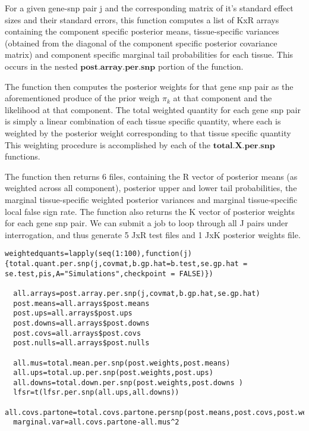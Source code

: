 \documentclass[10pt]{article}
\begin{document}
For a given gene-snp pair j and the corresponding matrix of it's standard effect sizes and their standard errors, this function computes a list of KxR arrays  containing the component specific posterior means, tissue-specific variances (obtained from the diagonal of the component specific posterior covariance matrix) and component specific marginal tail probabilities for each tissue. This occurs in the nested $\textbf{post.array.per.snp}$ portion of the function.

The function then computes the posterior weights for that gene snp pair as the aforementioned produce of the prior weigh $\pi_{k}$ at that component and the likelihood at that component. The total weighted quantity for each gene snp pair is simply a linear combination of each tissue specific quantity, where each is weighted by the posterior weight corresponding to that tissue specific quantity This weighting procedure is accomplished by each of the $\textbf{total.X.per.snp}$ functions.

The function then returns  6 files, containing the R vector of posterior means (as weighted across all component), posterior upper and lower tail probabilities, the marginal tissue-specific weighted posterior variances and marginal tissue-specific local false sign rate. The function also returns the K vector of posterior weights for each gene snp pair. We can submit a job to loop through all J pairs under interrogation, and thus generate 5 JxR test files and 1 JxK posterior weights file.

\begin{verbatim}
weightedquants=lapply(seq(1:100),function(j){total.quant.per.snp(j,covmat,b.gp.hat=b.test,se.gp.hat = se.test,pis,A="Simulations",checkpoint = FALSE)})
                          
  all.arrays=post.array.per.snp(j,covmat,b.gp.hat,se.gp.hat)
  post.means=all.arrays$post.means
  post.ups=all.arrays$post.ups
  post.downs=all.arrays$post.downs
  post.covs=all.arrays$post.covs
  post.nulls=all.arrays$post.nulls
  
  all.mus=total.mean.per.snp(post.weights,post.means)
  all.ups=total.up.per.snp(post.weights,post.ups)
  all.downs=total.down.per.snp(post.weights,post.downs )
  lfsr=t(lfsr.per.snp(all.ups,all.downs))
  all.covs.partone=total.covs.partone.persnp(post.means,post.covs,post.weights)
  marginal.var=all.covs.partone-all.mus^2

\end{verbatim}


\end{document}
